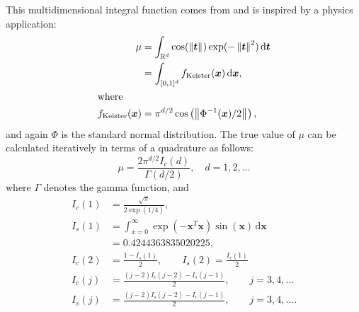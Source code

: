 \documentclass[twocolumn]{svjour3}          %
\newcommand{\bm}[1]{\boldsymbol{#1}}
\newcommand{\dif}[1]{\text{d}{#1}}
\newcommand{\reals}{\mathbb{R}}
\newcommand{\vt}{\bm{t}}
\newcommand{\vx}{\bm{x}}
\newcommand{\dvx}{\dif{\bm{x}}}
\newcommand{\dvt}{\dif{\bm{t}}}
\newcommand{\norm}[2][{}]{\ensuremath{\left \lVert #2 \right \rVert}_{#1}}
\begin{document}
This multidimensional integral function comes from \cite{Kei96} and is inspired by a physics application:
\begin{align*}
\mu & =  \int_{\reals^d} \cos(\norm{ \vt}) \exp(-\norm{ \vt }^2) \, \dvt \\
\nonumber
& = \int_{[0,1]^d} f_{\textup{Keister}}(\vx) \, \dvx,\\
\intertext{where }
f_\textup{Keister}(\vx) &= \pi^{d/2} \cos\left(\norm{ \Phi^{-1}(\vx)/2}\right)  ,
\end{align*}
and again $\Phi$ is the standard normal distribution.
The true value of $\mu$ can be calculated iteratively in terms of a quadrature as follows:  
\begin{equation*}
\mu = \frac{2 \pi^{d/2} I_c(d)}{\Gamma(d/2)}, \quad d=1,2, \ldots
\end{equation*}
where $\Gamma$ denotes the gamma function, and
\begin{align*}
I_c(1) &= \frac{\sqrt{\pi}}{2 \exp(1/4)}, 
\\
I_s(1) &= \int_{x=0}^\infty \exp(-\vx^T\vx)\sin(\vx) \, \dvx 
\\
& =  0.4244363835020225,
\\
I_c(2) &= \frac{1-I_s(1)}{2}, \qquad
I_s(2) = \frac{I_c(1)}{2}
\\
I_c(j) &= \frac{(j-2)I_c(j-2)-I_s(j-1)}{2},
\qquad j =3,4,\ldots
\\
I_s(j) &= \frac{(j-2)I_s(j-2)-I_c(j-1)}{2},
\qquad j =3,4,\ldots.
\end{align*}
\end{document}
